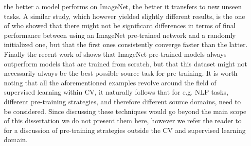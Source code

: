 the better a model performs on ImageNet, the better it transfers to new unseen tasks. A similar study, which however yielded slightly different results, is the one of \citet{he2019rethinking} who showed that there might not be significant differences in terms of final performance between using an ImageNet pre-trained network and a randomly initialized one, but that the first ones consistently converge faster than the latter. Finally the recent work of \citet{mensink2021factors} shows that ImageNet pre-trained models always outperform models that are trained from scratch, but that this dataset might not necessarily always be the best possible source task for pre-training. It is worth noting that all the aforementioned examples revolve around the field of supervised learning within CV, it naturally follows that for e.g. NLP tasks, different pre-training strategies, and therefore different source domains, need to be considered. Since discussing these techniques would go beyond the main scope of this dissertation we do not present them here, however we refer the reader to \cite{mikolov2013efficient,rosset2020knowledge,brown2020language,devlin2018bert} for a discussion of pre-training strategies outside the CV and supervised learning domain.

